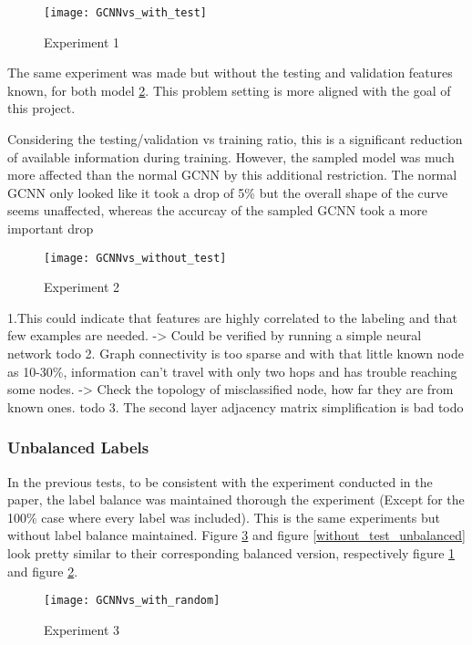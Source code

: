 \documentclass{article}
\begin{document}
\begin{figure}[h]
\centering
\texttt{[image: GCNNvs\_with\_test]}
\caption{
Experiment 1
}
\label{with_test_balanced}
\end{figure}

The same experiment was made but without the testing and validation features known, for both model \ref{without_test_balanced}. This problem setting is more aligned with the goal of this project.

Considering the testing/validation vs training ratio, this is a significant reduction of available information during training. However, the sampled model was much more affected than the normal GCNN by this additional restriction. The normal GCNN only looked like it took a drop of 5\% but the overall shape of the curve seems unaffected, whereas the accurcay of the sampled GCNN took a more important drop 

\begin{figure}[h]
\centering
\texttt{[image: GCNNvs\_without\_test]}
\caption{
Experiment 2
}
\label{without_test_balanced}
\end{figure}


1.This could indicate that features are highly correlated to the labeling and that few examples are needed. -> Could be verified by running a simple neural network todo
2. Graph connectivity is too sparse and with that little known node as 10-30\%, information can't travel with only two hops and has trouble reaching some nodes. -> Check the topology of misclassified node, how far they are from known ones. todo
3. The second layer adjacency matrix simplification is bad todo

               
\subsubsection*{Unbalanced Labels}
In the previous tests, to be consistent with the experiment conducted in the paper, the label balance was maintained thorough the experiment (Except for the 100\% case where every label was included). This is the same experiments but without label balance maintained. Figure \ref{with_test_unbalanced} and figure \ref{without_test_unbalanced} look pretty similar to their corresponding balanced version, respectively figure \ref{with_test_balanced} and figure \ref{without_test_balanced}.

\begin{figure}[h]
\centering
\texttt{[image: GCNNvs\_with\_random]}
\caption{
Experiment 3
}
\label{with_test_unbalanced}
\end{figure}
\end{document}
